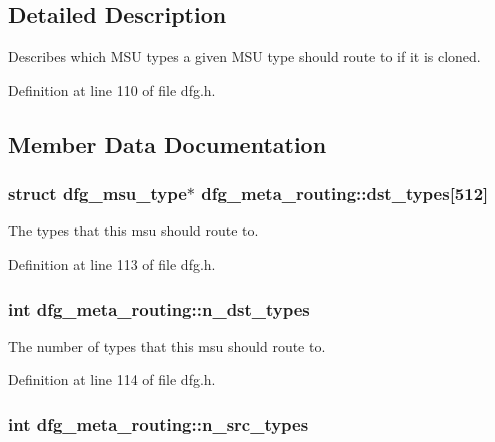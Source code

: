 \subsection{Detailed Description}
Describes which M\-S\-U types a given M\-S\-U type should route to if it is cloned. 

Definition at line 110 of file dfg.\-h.



\subsection{Member Data Documentation}
\hypertarget{structdfg__meta__routing_a33011fd118a329e61f37c05a6d094f7d}{
\subsubsection[{dst\-\_\-types}]{\setlength{\rightskip}{0pt plus 5cm}struct {\bf dfg\-\_\-msu\-\_\-type}$\ast$ dfg\-\_\-meta\-\_\-routing\-::dst\-\_\-types\mbox{[}512\mbox{]}}}\label{structdfg__meta__routing_a33011fd118a329e61f37c05a6d094f7d}


The types that this msu should route to. 



Definition at line 113 of file dfg.\-h.

\hypertarget{structdfg__meta__routing_a70780c9f090459860034252dfa139808}{
\subsubsection[{n\-\_\-dst\-\_\-types}]{\setlength{\rightskip}{0pt plus 5cm}int dfg\-\_\-meta\-\_\-routing\-::n\-\_\-dst\-\_\-types}}\label{structdfg__meta__routing_a70780c9f090459860034252dfa139808}


The number of types that this msu should route to. 



Definition at line 114 of file dfg.\-h.

\hypertarget{structdfg__meta__routing_adb2586e29348fe1efe970f56cfe4a789}{
\subsubsection[{n\-\_\-src\-\_\-types}]{\setlength{\rightskip}{0pt plus 5cm}int dfg\-\_\-meta\-\_\-routing\-::n\-\_\-src\-\_\-types}}\label{structdfg__meta__routing_adb2586e29348fe1efe970f56cfe4a789}


